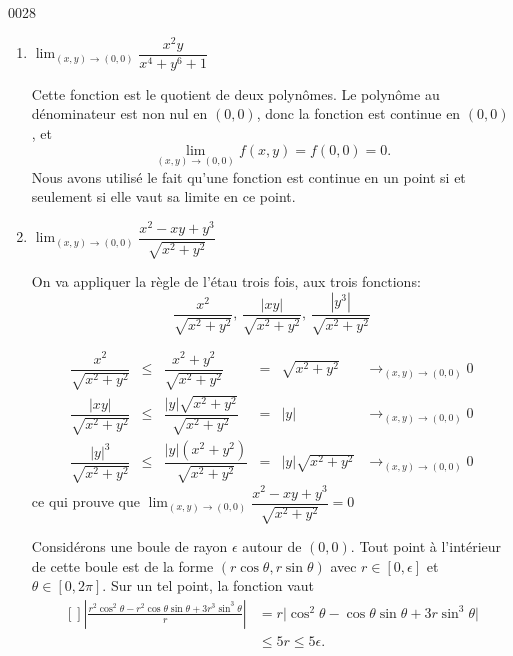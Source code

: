 
\begin{corrige}{0028}


\begin{enumerate}
\item $\lim_{(x,y)\rightarrow (0,0)} \dfrac{x^2y}{x^4+y^6+1}$

	Cette fonction est le quotient de deux polynômes. Le polynôme au dénominateur est non nul en $(0,0)$, donc la fonction est continue en $(0,0)$, et 
\begin{equation}
\lim_{(x,y)\rightarrow (0,0)}f(x,y)= f(0,0) = 0.
\end{equation}
Nous avons utilisé le fait qu'une fonction est continue en un point si et seulement si elle vaut sa limite en ce point.


\item  $\lim_{(x,y)\rightarrow (0,0)} \dfrac{x^2-xy+y^3}{\sqrt{x^2+y^2}}$

	On va appliquer la règle de l'étau trois fois, aux trois fonctions:
	\[\dfrac{x^2}{\sqrt{x^2+y^2}}, \, \dfrac{|xy|}{\sqrt{x^2+y^2}}, \, \dfrac{|y^3|}{\sqrt{x^2+y^2}}\]

    \[\begin{array}{cccccc} 

	\dfrac{x^2}{\sqrt{x^2+y^2}}&\leq& \dfrac{x^2+y^2}{\sqrt{x^2+y^2}} &=& \sqrt{x^2+y^2} & \longrightarrow_{(x,y)\rightarrow (0,0)}0\\

	\dfrac{|xy|}{\sqrt{x^2+y^2}} & \leq &  \dfrac{|y|\sqrt{x^2+y^2}}{\sqrt{x^2+y^2}} &=& |y|  &\longrightarrow_{(x,y)\rightarrow (0,0)}0\\

	\dfrac{|y|^3}{\sqrt{x^2+y^2}} &\leq& \dfrac{|y|(x^2+y^2)}{\sqrt{x^2+y^2}} &=& |y|\sqrt{x^2+y^2} & \longrightarrow_{(x,y)\rightarrow (0,0)}0

    \end{array} \]
	ce qui prouve que  $\lim_{(x,y)\rightarrow (0,0)} \dfrac{x^2-xy+y^3}{\sqrt{x^2+y^2}} = 0$

\begin{alternative}
Considérons une boule de rayon $\epsilon$ autour de $(0,0)$. Tout point à l'intérieur de cette boule est de la forme $(r\cos\theta,r\sin\theta)$ avec $r\in[0,\epsilon]$ et $\theta\in[0,2\pi]$. Sur un tel point, la fonction vaut
\begin{equation}
	\begin{aligned}[]
	\left| \frac{ r^2\cos^2\theta -r^2\cos\theta\sin\theta+3r^3\sin^3\theta }{ r }\right|&=r\big| \cos^2\theta-\cos\theta\sin\theta+3r\sin^3\theta \big|\\
				&\leq 5r\leq 5\epsilon.
	\end{aligned}
\end{equation}


\end{alternative}
\end{enumerate}
\end{corrige}
